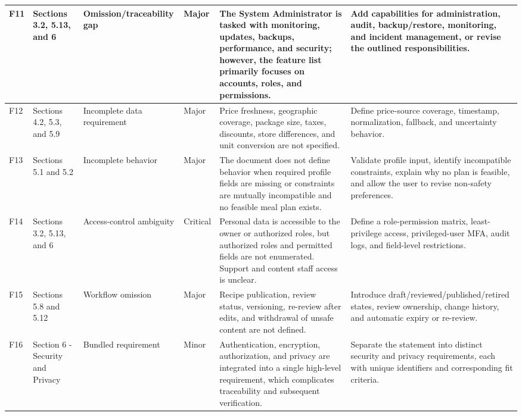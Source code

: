 \documentclass[11pt,a4paper]{article}
\begin{document}
\begin{landscape}
\begin{center}
\begin{longtable}{|p{0.9cm}|p{2.1cm}|p{2.4cm}|p{1.35cm}|p{8.4cm}|p{8.4cm}|}
F11 & Sections 3.2, 5.13, and 6 & Omission/traceability gap & Major & The System Administrator is tasked with monitoring, updates, backups, performance, and security; however, the feature list primarily focuses on accounts, roles, and permissions. & Add capabilities for administration, audit, backup/restore, monitoring, and incident management, or revise the outlined responsibilities. \\ \hline
F12 & Sections 4.2, 5.3, and 5.9 & Incomplete data requirement & Major & Price freshness, geographic coverage, package size, taxes, discounts, store differences, and unit conversion are not specified. & Define price-source coverage, timestamp, normalization, fallback, and uncertainty behavior. \\ \hline
F13 & Sections 5.1 and 5.2 & Incomplete behavior & Major & The document does not define behavior when required profile fields are missing or constraints are mutually incompatible and no feasible meal plan exists. & Validate profile input, identify incompatible constraints, explain why no plan is feasible, and allow the user to revise non-safety preferences. \\ \hline
F14 & Sections 3.2, 5.13, and 6 & Access-control ambiguity & Critical & Personal data is accessible to the owner or authorized roles, but authorized roles and permitted fields are not enumerated. Support and content staff access is unclear. & Define a role-permission matrix, least-privilege access, privileged-user MFA, audit logs, and field-level restrictions. \\ \hline
F15 & Sections 5.8 and 5.12 & Workflow omission & Major & Recipe publication, review status, versioning, re-review after edits, and withdrawal of unsafe content are not defined. & Introduce draft/reviewed/published/retired states, review ownership, change history, and automatic expiry or re-review. \\ \hline
F16 & Section 6 - Security and Privacy & Bundled requirement & Minor & Authentication, encryption, authorization, and privacy are integrated into a single high-level requirement, which complicates traceability and subsequent verification. & Separate the statement into distinct security and privacy requirements, each with unique identifiers and corresponding fit criteria. \\ \hline
\end{longtable}
\end{center}
\end{landscape}
\end{document}
